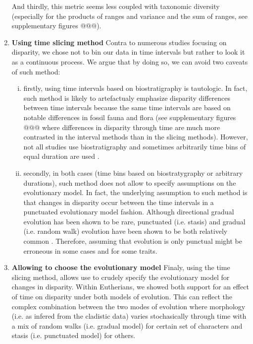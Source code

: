 \documentclass[12pt,letterpaper]{article}
\begin{document}
\begin{enumerate}
    And thirdly, this metric seems less coupled with taxonomic diversity (especially for the products of ranges and variance and the sum of ranges, see supplementary figures @@@).
    \item \textbf{Using time slicing method}
    Contra to numerous studies focusing on disparity, we chose not to bin our data in time intervals but rather to look it as a continuous process.
    We argue that by doing so, we can avoid two caveats of such method: 
    \begin{enumerate}[(i)]
        \item firstly, using time intervals based on biostratigraphy is tautologic.
        In fact, such method is likely to artefactualy emphasize disparity differences between time intervals because the same time intervals are based on notable differences in fossil fauna and flora (see supplementary figures @@@ where differences in disparity through time are much more contrasted in the interval methods than in the slicing methods).
        However, not all studies use biostratigraphy and sometimes arbitrarily time bins of equal duration are used \citep{hopkinsdecoupling2013,bensonfaunal2014}.
        \item secondly, in both cases (time bins based on biostratygraphy or arbitrary durations), such method does not allow to specify assumptions on the evolutionary model.
        In fact, the underlying assumption to such method is that changes in disparity occur between the time intervals in a punctuated evolutionary model fashion.
        Although directional gradual evolution has been shown to be rare, punctuated (i.e. stasis) and gradual (i.e. random walk) evolution have been shown to be both relatively common \cite{Hunt20112007,Hunt21042015}.
        Therefore, assuming that evolution is only punctual might be erroneous in some cases and for some traits.
    \end{enumerate}
    \item \textbf{Allowing to choose the evolutionary model}
    Finaly, using the time slicing method, allows use to crudely specify the evolutionary model for changes in disparity.
    Within Eutherians, we showed both support for an effect of time on disparity under both models of evolution.
    This can reflect the complex combination between the two modes of evolution where morphology (i.e. as infered from the cladistic data) varies stochasically through time with a mix of random walks (i.e. gradual model) for certain set of characters and stasis (i.e. punctuated model) for others.

\end{enumerate}
\end{document}
